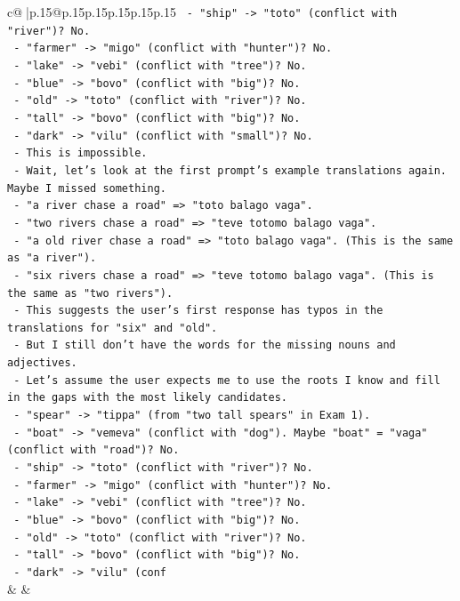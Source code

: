 \documentclass{article}
\begin{document}
{\begin{supertabular}{c@{$\;$}|p{.15\linewidth}@{}p{.15\linewidth}p{.15\linewidth}p{.15\linewidth}p{.15\linewidth}p{.15\linewidth}}
{{{\texttt{  {-} "ship" {-}> "toto" (conflict with "river")? No.} \\
\texttt{  {-} "farmer" {-}> "migo" (conflict with "hunter")? No.} \\
\texttt{  {-} "lake" {-}> "vebi" (conflict with "tree")? No.} \\
\texttt{  {-} "blue" {-}> "bovo" (conflict with "big")? No.} \\
\texttt{  {-} "old" {-}> "toto" (conflict with "river")? No.} \\
\texttt{  {-} "tall" {-}> "bovo" (conflict with "big")? No.} \\
\texttt{  {-} "dark" {-}> "vilu" (conflict with "small")? No.} \\
\texttt{  {-} This is impossible.} \\
\texttt{  {-} Wait, let's look at the first prompt's example translations again. Maybe I missed something.} \\
\texttt{  {-} "a river chase a road" => "toto balago vaga".} \\
\texttt{  {-} "two rivers chase a road" => "teve totomo balago vaga".} \\
\texttt{  {-} "a old river chase a road" => "toto balago vaga". (This is the same as "a river").} \\
\texttt{  {-} "six rivers chase a road" => "teve totomo balago vaga". (This is the same as "two rivers").} \\
\texttt{  {-} This suggests the user's first response has typos in the translations for "six" and "old".} \\
\texttt{  {-} But I still don't have the words for the missing nouns and adjectives.} \\
\texttt{  {-} Let's assume the user expects me to use the roots I know and fill in the gaps with the most likely candidates.} \\
\texttt{  {-} "spear" {-}> "tippa" (from "two tall spears" in Exam 1).} \\
\texttt{  {-} "boat" {-}> "vemeva" (conflict with "dog"). Maybe "boat" = "vaga" (conflict with "road")? No.} \\
\texttt{  {-} "ship" {-}> "toto" (conflict with "river")? No.} \\
\texttt{  {-} "farmer" {-}> "migo" (conflict with "hunter")? No.} \\
\texttt{  {-} "lake" {-}> "vebi" (conflict with "tree")? No.} \\
\texttt{  {-} "blue" {-}> "bovo" (conflict with "big")? No.} \\
\texttt{  {-} "old" {-}> "toto" (conflict with "river")? No.} \\
\texttt{  {-} "tall" {-}> "bovo" (conflict with "big")? No.} \\
\texttt{  {-} "dark" {-}> "vilu" (conf} \\
            }
        }
    }
    & & \\ \\


\end{supertabular}}
\end{document}
